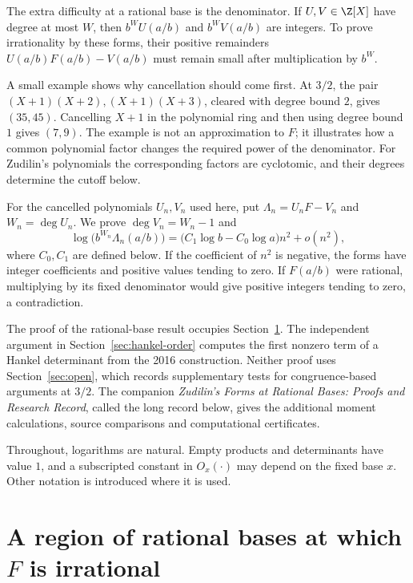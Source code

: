 \documentclass[11pt]{article}
\begin{document}
The extra difficulty at a rational base is the denominator. If
$U,V\in\Z[X]$ have degree at most $W$, then $b^WU(a/b)$ and
$b^WV(a/b)$ are integers. To prove irrationality by these forms, their positive remainders
$U(a/b)F(a/b)-V(a/b)$ must remain small after multiplication by $b^W$.

A small example shows why cancellation should come first. At $3/2$,
the pair $(X+1)(X+2),(X+1)(X+3)$, cleared with degree bound $2$, gives
$(35,45)$. Cancelling $X+1$ in the polynomial ring and then using
degree bound $1$ gives $(7,9)$. The example is not an approximation to $F$;
it illustrates how a common polynomial factor changes the required
power of the denominator. For Zudilin's polynomials the corresponding
factors are cyclotomic, and their degrees determine the cutoff below.

For the cancelled polynomials $U_n,V_n$ used here, put
$\Lambda_n=U_nF-V_n$ and $W_n=\deg U_n$. We prove
$\deg V_n=W_n-1$ and
\[
 \log\!\bigl(b^{W_n}\Lambda_n(a/b)\bigr)
 =\bigl(C_1\log b-C_0\log a\bigr)n^2+o(n^2),
\]
where $C_0,C_1$ are defined below. If the coefficient of $n^2$ is negative,
the forms have integer coefficients and positive values tending to zero.
If $F(a/b)$ were rational, multiplying by its fixed denominator would
give positive integers tending to zero, a contradiction.

The proof of the rational-base result occupies
Section~\ref{sec:rational-base-irrationality}. The independent argument
in Section~\ref{sec:hankel-order} computes the first nonzero term of a
Hankel determinant from the 2016 construction. Neither proof uses
Section~\ref{sec:open}, which records supplementary tests for
congruence-based arguments at $3/2$.
The companion \emph{Zudilin's Forms at Rational Bases: Proofs and
Research Record}, called the long record below, gives the additional
moment calculations, source comparisons and computational certificates.

Throughout, logarithms are natural. Empty products and determinants
have value $1$, and a subscripted constant in $O_x(\cdot)$ may depend
on the fixed base $x$. Other notation is introduced where it is used.


\section{A region of rational bases at which \texorpdfstring{$F$}{F} is irrational}
\label{sec:rational-base-irrationality}
\end{document}
